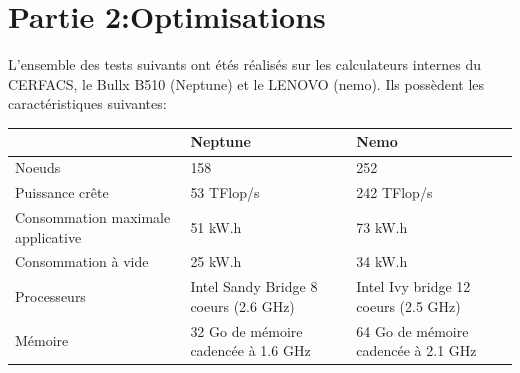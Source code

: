 \section{Partie 2:Optimisations}

L'ensemble des tests suivants ont étés réalisés sur les calculateurs internes du CERFACS, le Bullx B510 (Neptune) et le LENOVO (nemo). Ils possèdent les caractéristiques suivantes:


\begin{tabular}{|p{3.5cm}|p{5cm}|p{5cm}|}
  \hline
  & Neptune & Nemo \\
  \hline
  Noeuds & 158 & 252 \\
  \hline
  Puissance crête & 53 TFlop/s & 242 TFlop/s \\
  \hline
  Consommation maximale applicative & 51 kW.h & 73 kW.h \\
  \hline
  Consommation à vide & 25 kW.h & 34 kW.h \\
  \hline
  \hline
  Processeurs & Intel Sandy Bridge 8 coeurs (2.6 GHz) & Intel Ivy bridge 12 coeurs (2.5 GHz) \\
  \hline
  Mémoire & 32 Go de mémoire cadencée à 1.6 GHz & 64 Go de mémoire cadencée à 2.1 GHz \\
  \hline



\end{tabular}


